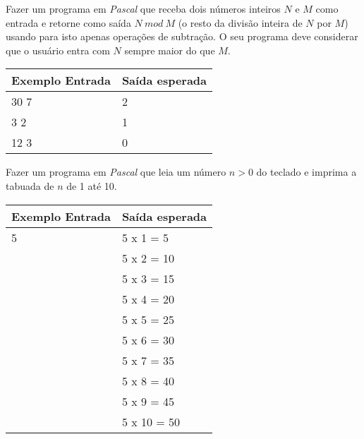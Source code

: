 \item Fazer um programa em \emph{Pascal} que receba dois números inteiros $N$ e
  $M$ como entrada e retorne como saída $N \ mod \ M$ (o resto da
  divisão inteira de $N$ por $M$) usando para isto apenas
  operações de subtração. O seu programa
  deve considerar que o usuário entra com $N$ sempre maior do que $M$.

\begin{center}
\begin{tabular}{|l|l|} \hline
Exemplo Entrada & Saída esperada \\ \hline
30 7            & 2              \\ \hline
3 2             & 1              \\ \hline
12 3            & 0              \\ \hline
\end{tabular}
\end{center}

\item Fazer um programa em \emph{Pascal} que leia um número $n > 0$ do
teclado e imprima a tabuada de $n$ de 1 até 10.

\begin{center}
\begin{tabular}{|l|l|} \hline
Exemplo Entrada & Saída esperada \\ \hline
5               & 5 x 1 = 5 \\
                & 5 x 2 = 10 \\
                & 5 x 3 = 15 \\
                & 5 x 4 = 20 \\
                & 5 x 5 = 25 \\
                & 5 x 6 = 30 \\
                & 5 x 7 = 35 \\
                & 5 x 8 = 40 \\
                & 5 x 9 = 45 \\
                & 5 x 10 = 50 \\ \hline
\end{tabular}
\end{center}
